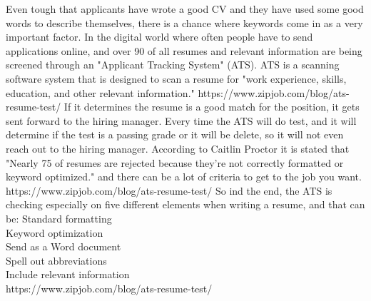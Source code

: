 Even tough that applicants have wrote a good CV and they have used some good words to describe themselves,
there is a chance where keywords come in as a very important factor. In the digital world where often people have to send applications online, and over 90 %
of all resumes and relevant information are being screened through an "Applicant Tracking System" (ATS). ATS is a scanning software system
that is designed to scan a resume for "work experience, skills, education, and other relevant information." https://www.zipjob.com/blog/ats-resume-test/
If it determines the resume is a good match for the position, it gets sent forward to the hiring manager.
Every time the ATS will do test, and it will determine if the test is a passing grade or it will be delete, so it will not even reach out to the hiring manager.
According to Caitlin Proctor it is stated that "Nearly 75 %
of resumes are rejected because they’re not correctly formatted or keyword optimized." and there can be a lot of criteria
to get to the job you want. https://www.zipjob.com/blog/ats-resume-test/
So ind the end, the ATS is checking especially on five different elements when writing a resume, and that can be:
Standard formatting \\
Keyword optimization \\
Send as a Word document \\
Spell out abbreviations \\
Include relevant information \\
https://www.zipjob.com/blog/ats-resume-test/

